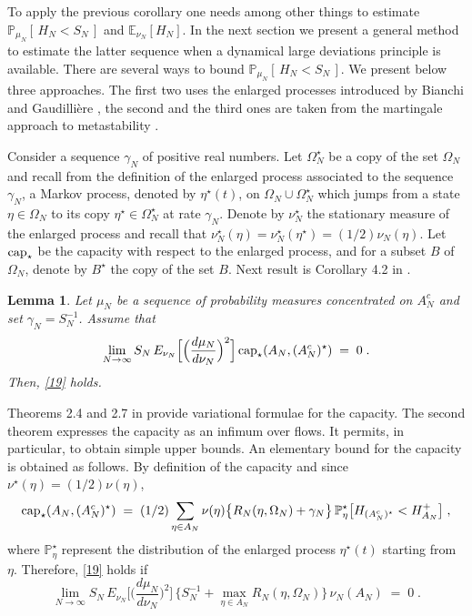 \documentclass[reqno]{amsart}
\newtheorem{lemma}[theorem]{Lemma}
\begin{document}
To apply the previous corollary one needs among other things to
estimate ${{\mathbb P}}_{\mu_N} [\, H_N < S_N \,]$ and ${{\mathbb E}}_{\nu_N}
[H_N]$. In the next section we present a general method to estimate
the latter sequence when a dynamical large deviations principle is
available. There are several ways to bound ${{\mathbb P}}_{\mu_N} [\, H_N <
S_N \,]$. We present below three approaches. The first two uses the
enlarged processes introduced by Bianchi and Gaudilli\`ere \cite{bg1},
the second and the third ones are taken from the martingale approach
to metastability \cite{bl9}.

Consider a sequence $\gamma_N$ of positive real numbers. Let
$\Omega^\star_N$ be a copy of the set $\Omega_N$ and recall from
\cite[Section 2.C]{bl9} the definition of the enlarged process
associated to the sequence $\gamma_N$, a Markov process, denoted by
$\eta^\star(t)$, on $\Omega_N \cup \Omega^\star_N$ which jumps from a
state $\eta\in \Omega_N$ to its copy $\eta^\star\in \Omega^\star_N$ at
rate $\gamma_N$. Denote by $\nu^\star_N$ the stationary measure of the
enlarged process and recall that $\nu^\star_N (\eta) = \nu^\star_N
(\eta^\star) = (1/2) \nu_N (\eta)$. Let ${{\rm cap}}_\star$ be the capacity
with respect to the enlarged process, and for a subset $B$ of
$\Omega_N$, denote by $B^\star$ the copy of the set $B$.  Next result
is Corollary 4.2 in \cite{bl9}.

\begin{lemma}
\label{s17}
Let $\mu_N$ be a sequence of probability measures concentrated on
$A^c_N$ and set $\gamma_N = S^{-1}_N$. Assume that
\begin{equation*}
\lim_{N\to\infty} S_N  \, E_{\nu_N} \Big[ \Big( 
\frac{d\mu_N}{d\nu_N}\Big)^2 \Big]\, 
{{\rm cap}}_\star(A_N, (A^{c}_N)^\star)\;=\; 0\;.
\end{equation*}
Then, \eqref{19} holds.
\end{lemma}

Theorems 2.4 and 2.7 in \cite{gl2} provide variational formulae for
the capacity. The second theorem expresses the capacity as an infimum
over flows. It permits, in particular, to obtain simple upper bounds.
An elementary bound for the capacity is obtained as follows. By
definition of the capacity and since $\nu^\star (\eta) = (1/2)
\nu(\eta)$,
\begin{equation*}
{{\rm cap}}_\star(A_N, (A^{c}_N)^\star) \;=\; (1/2) \sum_{\eta\in A_N}
\nu(\eta) \big\{ R_N(\eta, \Omega_N) + \gamma_N \big\}\,
{{\mathbb P}}^\star_\eta \big[H_{(A^{c}_N)^\star} < H^+_{A_N} \big] \;,
\end{equation*}
where ${{\mathbb P}}^\star_\eta$ represent the distribution of the enlarged
process $\eta^\star(t)$ starting from $\eta$. Therefore, \eqref{19}
holds if
\begin{equation}
\label{22}
\lim_{N\to\infty} S_N  \, E_{\nu_N} \Big[ \Big( 
\frac{d\mu_N}{d\nu_N}\Big)^2 \Big]\, 
\big\{ S^{-1}_N + \max_{\eta\in A_N} R_N(\eta, \Omega_N)\big\} 
\, \nu_N(A_N) \;=\; 0\;.
\end{equation}
\end{document}
